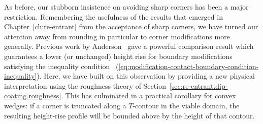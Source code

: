 As before,
our stubborn insistence on avoiding sharp corners
has been a major restriction.
Remembering the usefulness of the results that emerged
in Chapter~\ref{ch:re-entrant}
from the acceptance of sharp corners,
we have turned our attention away from rounding in particular
to corner modifications more generally.
Previous work
by Anderson~\cite[Section~7.3.2]{anderson-2002-thesis-boundary-tracing-pdes}
gave a powerful comparison result
which guarantees a lower (or unchanged) height rise
for boundary modifications satisfying the inequality condition~%
  (\ref{eq:modification-contact-boundary-condition-inequality}).
Here, we have built on this observation
by providing a new physical interpretation
using the roughness theory
of Section~\ref{sec:re-entrant.dip-coating.roughness}.
This has culminated in a practical corollary for convex wedges:
if a corner is truncated along a $T$-contour in the viable domain,
the resulting height-rise profile will be bounded above
by the height of that contour.
